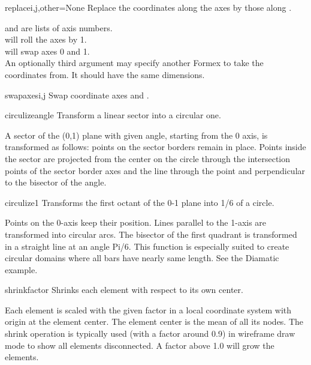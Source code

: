 {{\begin{methoddesc}{replace}{i,j,other=None}
Replace the coordinates along the axes  by those along .

 and  are lists of axis numbers.\\
 will roll the axes by 1.\\
 will swap axes 0 and 1.\\
An optionally third argument may specify another Formex to take the coordinates from. It should have the same dimensions.
\end{methoddesc}

\begin{methoddesc}{swapaxes}{i,j}
Swap coordinate axes  and .
\end{methoddesc}

\begin{methoddesc}{circulize}{angle}
Transform a linear sector into a circular one.

A sector of the (0,1) plane with given angle, starting from the 0 axis,
is transformed as follows: points on the sector borders remain in
place. Points inside the sector are projected from the center on the
circle through the intersection points of the sector border axes and
the line through the point and perpendicular to the bisector of the
angle.
\end{methoddesc}

\begin{methoddesc}{circulize1}{}
Transforms the first octant of the 0-1 plane into 1/6 of a circle.

Points on the 0-axis keep their position. Lines parallel to the 1-axis
are transformed into circular arcs. The bisector of the first quadrant
is transformed in a straight line at an angle Pi/6.
This function is especially suited to create circular domains where
all bars have nearly same length. See the Diamatic example.
\end{methoddesc}

\begin{methoddesc}{shrink}{factor}
Shrinks each element with respect to its own center.

Each element is scaled with the given factor in a local coordinate
system with origin at the element center. The element center is the
mean of all its nodes.
The shrink operation is typically used (with a factor around 0.9) in
wireframe draw mode to show all elements disconnected. A factor above
1.0 will grow the elements.
\end{methoddesc}


}}
